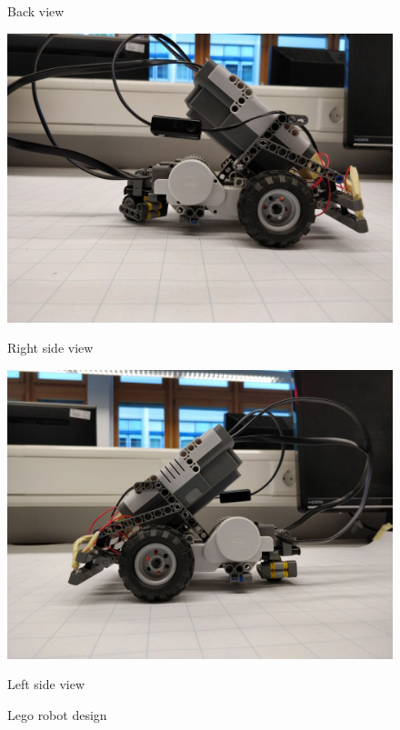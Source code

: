 \documentclass[11pt,a4paper,openright,twoside]{extreport}
\begin{document}
\begin{enumerate}
\begin{figure}[ht]
\begin{minipage}[b]{0.5\textwidth}
    \captionsetup{labelformat=empty}
    \caption{Back view} 
    \vspace{4ex}
  \end{minipage} 
  \begin{minipage}[b]{0.5\textwidth}
    \centering
    \includegraphics[width=.9\textwidth]{rightSide.jpeg}
    \captionsetup{labelformat=empty}
    \caption{Right side view} 
    \vspace{4ex}
  \end{minipage}%
  \begin{minipage}[b]{0.5\textwidth}
    \centering
    \includegraphics[width=.9\textwidth]{leftSide.jpeg}
    \captionsetup{labelformat=empty}
    \caption{Left side view} 
    \vspace{4ex}
  \end{minipage}
\caption{Lego robot design}
\label{legobot}
\end{figure}


\end{enumerate}
\end{document}

